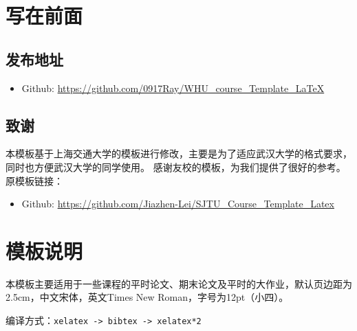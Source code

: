 \documentclass[12pt,hyperref,a4paper,UTF8]{ctexart}
\begin{document}
\cover
%
%

\thispagestyle{empty} %

\newpage
\tableofcontents

\newpage

\section{写在前面}
\subsection{发布地址}
\begin{itemize}
    \item Github: \url{https://github.com/0917Ray/WHU_course_Template_LaTeX}
\end{itemize}
\subsection{致谢}
本模板基于上海交通大学的模板进行修改，主要是为了适应武汉大学的格式要求，同时也方便武汉大学的同学使用。
感谢友校的模板，为我们提供了很好的参考。
原模板链接：
\begin{itemize}
    \item Github: \url{https://github.com/Jiazhen-Lei/SJTU_Course_Template_Latex}
\end{itemize}
\section{模板说明}
本模板主要适用于一些课程的平时论文、期末论文及平时的大作业，默认页边距为2.5cm，中文宋体，英文Times New Roman，字号为12pt（小四）。

编译方式：\verb|xelatex -> bibtex -> xelatex*2|
\end{document}
